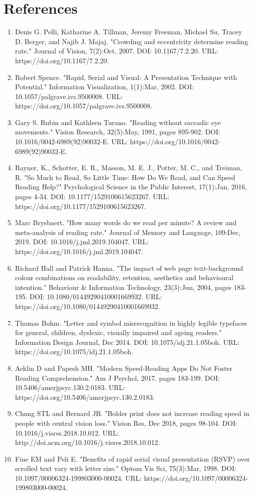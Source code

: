 \documentclass[manuscript,screen]{acmart}
\begin{document}
\section{References}
\footnotesize
\begin{enumerate}
    \item Denis G. Pelli, Katharine A. Tillman, Jeremy Freeman, Michael Su, Tracey D. Berger, and Najib J. Majaj. "Crowding and eccentricity determine reading rate." Journal of Vision, 7(2):Oct, 2007. DOI: 10.1167/7.2.20. URL: https://doi.org/10.1167/7.2.20.
    \item Robert Spence. "Rapid, Serial and Visual: A Presentation Technique with Potential." Information Visualization, 1(1):Mar, 2002. DOI: 10.1057/palgrave.ivs.9500008. URL: https://doi.org/10.1057/palgrave.ivs.9500008.
    \item Gary S. Rubin and Kathleen Turano. "Reading without saccadic eye movements." Vision Research, 32(5):May, 1991, pages 895-902. DOI: 10.1016/0042-6989(92)90032-E. URL: https://doi.org/10.1016/0042-6989(92)90032-E.
    \item Rayner, K., Schotter, E. R., Masson, M. E. J., Potter, M. C., and Treiman, R. "So Much to Read, So Little Time: How Do We Read, and Can Speed Reading Help?" Psychological Science in the Public Interest, 17(1):Jan, 2016, pages 4-34. DOI: 10.1177/1529100615623267. URL: https://doi.org/10.1177/1529100615623267.
    \item Marc Brysbaert. "How many words do we read per minute? A review and meta-analysis of reading rate." Journal of Memory and Language, 109:Dec, 2019. DOI: 10.1016/j.jml.2019.104047. URL: https://doi.org/10.1016/j.jml.2019.104047.
    \item Richard Hall and Patrick Hanna. "The impact of web page text-background colour combinations on readability, retention, aesthetics and behavioural intention." Behaviour \& Information Technology, 23(3):Jun, 2004, pages 183-195. DOI: 10.1080/01449290410001669932. URL: https://doi.org/10.1080/01449290410001669932.
    \item Thomas Bohm. "Letter and symbol misrecognition in highly legible typefaces for general, children, dyslexic, visually impaired and ageing readers." Information Design Journal, Dec 2014. DOI: 10.1075/idj.21.1.05boh. URL: https://doi.org/10.1075/idj.21.1.05boh.
    \item Acklin D and Papesh MH. "Modern Speed-Reading Apps Do Not Foster Reading Comprehension." Am J Psychol, 2017, pages 183-199. DOI: 10.5406/amerjpsyc.130.2.0183. URL: https://doi.org/10.5406/amerjpsyc.130.2.0183.
    \item Chung STL and Bernard JB. "Bolder print does not increase reading speed in people with central vision loss." Vision Res, Dec 2018, pages 98-104. DOI: 10.1016/j.visres.2018.10.012. URL: http://doi.acm.org/10.1016/j.visres.2018.10.012.
    \item Fine EM and Peli E. "Benefits of rapid serial visual presentation (RSVP) over scrolled text vary with letter size." Optom Vis Sci, 75(3):Mar, 1998. DOI: 10.1097/00006324-199803000-00024. URL: https://doi.org/10.1097/00006324-199803000-00024.
\end{enumerate}
\end{document}
